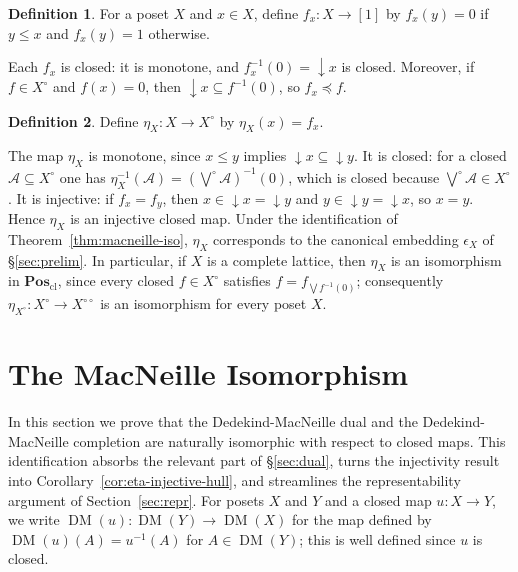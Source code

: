\documentclass{amsart}
\theoremstyle{plain}
\theoremstyle{definition}
\newtheorem{definition}{Definition}[section]
\theoremstyle{remark}
\DeclareMathOperator{\DM}{DM}
\begin{document}
\begin{definition}\label{def:fx}
For a poset $X$ and $x\in X$, define $f_x\colon X\to[1]$ by $f_x(y)=0$ if $y\leq x$ and $f_x(y)=1$ otherwise.
\end{definition}

Each $f_x$ is closed: it is monotone, and $f_x^{-1}(0)=\downarrow x$ is closed. Moreover, if $f\in X^\circ$ and $f(x)=0$, then $\downarrow x\subseteq f^{-1}(0)$, so $f_x\preceq f$.

\begin{definition}\label{def:eta}
Define $\eta_X\colon X\to X^\circ$ by $\eta_X(x)=f_x$.
\end{definition}

The map $\eta_X$ is monotone, since $x\leq y$ implies $\downarrow x\subseteq\downarrow y$. It is closed: for a closed $\mathcal{A}\subseteq X^\circ$ one has $\eta_X^{-1}(\mathcal{A})=(\bigvee^\circ\mathcal{A})^{-1}(0)$, which is closed because $\bigvee^\circ\mathcal{A}\in X^\circ$. It is injective: if $f_x=f_y$, then $x\in\downarrow x=\downarrow y$ and $y\in\downarrow y=\downarrow x$, so $x=y$. Hence $\eta_X$ is an injective closed map. Under the identification of Theorem~\ref{thm:macneille-iso}, $\eta_X$ corresponds to the canonical embedding $\epsilon_X$ of \S\ref{sec:prelim}. In particular, if $X$ is a complete lattice, then $\eta_X$ is an isomorphism in $\mathbf{Pos}_{\mathrm{cl}}$, since every closed $f\in X^\circ$ satisfies $f=f_{\bigvee f^{-1}(0)}$; consequently $\eta_{X^\circ}\colon X^\circ\to X^{\circ\circ}$ is an isomorphism for every poset $X$.

\section{The MacNeille Isomorphism}\label{sec:macneille-iso}

In this section we prove that the Dedekind-MacNeille dual and the Dedekind-MacNeille completion are naturally isomorphic with respect to closed maps. This identification absorbs the relevant part of \S\ref{sec:dual}, turns the injectivity result into Corollary~\ref{cor:eta-injective-hull}, and streamlines the representability argument of Section~\ref{sec:repr}. For posets $X$ and $Y$ and a closed map $u\colon X\to Y$, we write $\DM(u)\colon\DM(Y)\to\DM(X)$ for the map defined by $\DM(u)(A)=u^{-1}(A)$ for $A\in\DM(Y)$; this is well defined since $u$ is closed.
\end{document}
